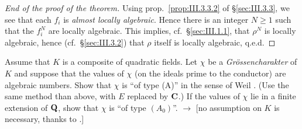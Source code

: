 \begin{proof}[End of the proof of the theorem]
Using prop.~\ref{prop:III.3.3.2} of \S\ref{sec:III.3.3}, we see
that each $f_i$ is \emph{almost locally algebraic}.  Hence there is
an integer $N\geq 1$ such that the $f_i^N$ are locally algebraic.
This implies, cf.~\S\ref{sec:III.1.1}, that $\rho^N$ is locally
algebraic, hence (cf.~\S\ref{sec:III.3.2}) that $\rho$ itself is
locally algebraic, q.e.d.
\end{proof}


Assume that $K$ is a composite of quadratic fields.  Let $\chi$ be
a \emph{Grössencharakter} of $K$ and suppose that the values of
$\chi$ (on the ideals prime to the conductor) are algebraic
numbers.  Show that $\chi$ is ``of type (A)'' in the sense of Weil
\cite{weil-characters}.  (Use the same method than above, with $E$
replaced by $\mathbf{C}$.)  If the values of $\chi$ lie in a finite
extension of $\mathbf{Q}$, show that $\chi$ is ``of type $(A_0)$''.
$\rightarrow$ [no assumption on $K$ is necessary, thanks to
\cite{waldschmidt}.]

